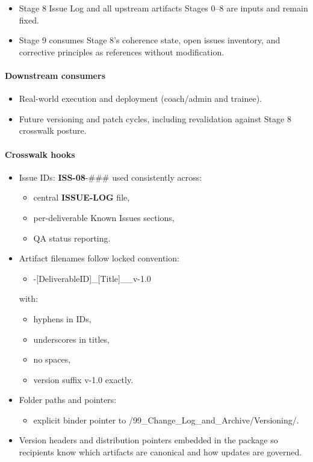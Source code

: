 \documentclass[10pt]{article}
\begin{document}
\begin{itemize}
\item Stage 8 Issue Log and all upstream artifacts Stages 0–8 are inputs and remain fixed.
\item Stage 9 consumes Stage 8’s coherence state, open issues inventory, and corrective principles as references without modification.
\end{itemize}

\paragraph*{Downstream consumers}

\begin{itemize}
\item Real-world execution and deployment (coach/admin and trainee).
\item Future versioning and patch cycles, including revalidation against Stage 8 crosswalk posture.
\end{itemize}

\paragraph*{Crosswalk hooks}

\begin{itemize}
\item Issue IDs: \textbf{ISS-08}-\#\#\# used consistently across:
  \begin{itemize}
  \item central \textbf{ISSUE-LOG} file,
  \item per-deliverable Known Issues sections,
  \item QA status reporting.
  \end{itemize}
\item Artifact filenames follow locked convention:
  \begin{itemize}
  \item [StageID]-[DeliverableID]\_[Title]\_\_v-1.0
  \end{itemize}
  with:
  \begin{itemize}
  \item hyphens in IDs,
  \item underscores in titles,
  \item no spaces,
  \item version suffix v-1.0 exactly.
  \end{itemize}
\item Folder paths and pointers:
  \begin{itemize}
  \item explicit binder pointer to /99\_Change\_Log\_and\_Archive/Versioning/.
  \end{itemize}
\item Version headers and distribution pointers embedded in the package so recipients know which artifacts are canonical and how updates are governed.
\end{itemize}
\end{document}
